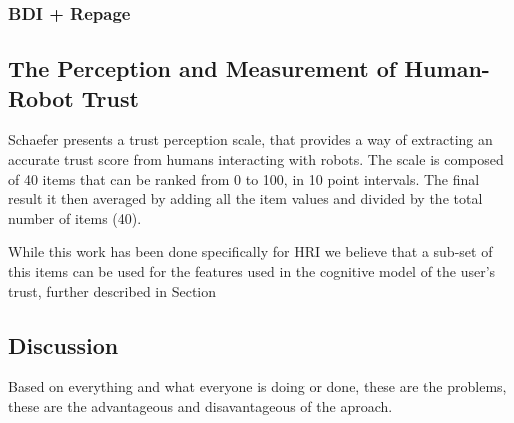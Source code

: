 \subsubsection{BDI + Repage}

\subsection{The Perception and Measurement of Human-Robot Trust}
\label{subsec:Related work:The Perception and Measurement of Human-Robot Trust}

Schaefer\cite{Schaefer2009} presents a trust perception scale, that provides a way of extracting an accurate trust score from humans interacting with robots. The scale is composed of 40 items that can be ranked from 0 to 100, in 10 point intervals. The final result it then averaged by adding all the item values and divided by the total number of items (40).



While this work has been done specifically for \ac{HRI} we believe that a sub-set of this items can be used for the features used in the cognitive model of the user's trust, further described in Section %






\subsection{Discussion}
\label{subsec:RelWorkDiscussion}

Based on everything and what everyone is doing or done, these are the problems, these are the advantageous and disavantageous of the aproach.